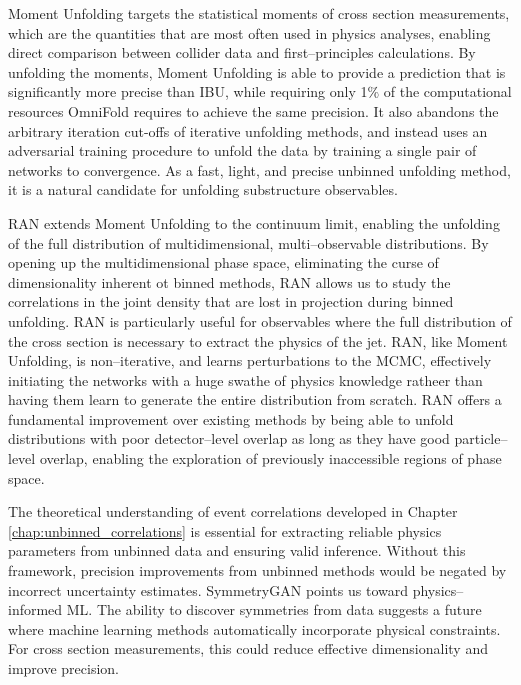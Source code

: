         Moment Unfolding targets the statistical moments of cross section measurements, which are the quantities that are most often used in physics analyses, enabling direct comparison between collider data and first--principles calculations.
        By unfolding the moments, Moment Unfolding is able to provide a prediction that is significantly more precise than IBU, while requiring only 1\(\%\) of the computational resources OmniFold requires to achieve the same precision.
        It also abandons the arbitrary iteration cut-offs of iterative unfolding methods, and instead uses an adversarial training procedure to unfold the data by training a single pair of networks to convergence.
        As a fast, light, and precise unbinned unfolding method, it is a natural candidate for unfolding substructure observables.
        
        RAN extends Moment Unfolding to the continuum limit, enabling the unfolding of the full distribution of multidimensional, multi--observable distributions.
        By opening up the multidimensional phase space, eliminating the curse of dimensionality inherent ot binned methods, RAN allows us to study the correlations in the joint density that are lost in projection during binned unfolding.
        RAN is particularly useful for observables where the full distribution of the cross section is necessary to extract the physics of the jet.
        RAN, like Moment Unfolding, is non--iterative, and learns perturbations to the MCMC, effectively initiating the networks with a huge swathe of physics knowledge ratheer than having them learn to generate the entire distribution from scratch.
        RAN offers a fundamental improvement over existing methods by being able to unfold distributions with poor detector--level overlap as long as they have good particle--level overlap, enabling the exploration of previously inaccessible regions of phase space.
        
        The theoretical understanding of event correlations developed in Chapter \ref{chap:unbinned_correlations} is essential for extracting reliable physics parameters from unbinned data and ensuring valid inference.
        Without this framework, precision improvements from unbinned methods would be negated by incorrect uncertainty estimates.
        SymmetryGAN points us toward physics--informed ML.
        The ability to discover symmetries from data suggests a future where machine learning methods automatically incorporate physical constraints.
        For cross section measurements, this could reduce effective dimensionality and improve precision.
    
